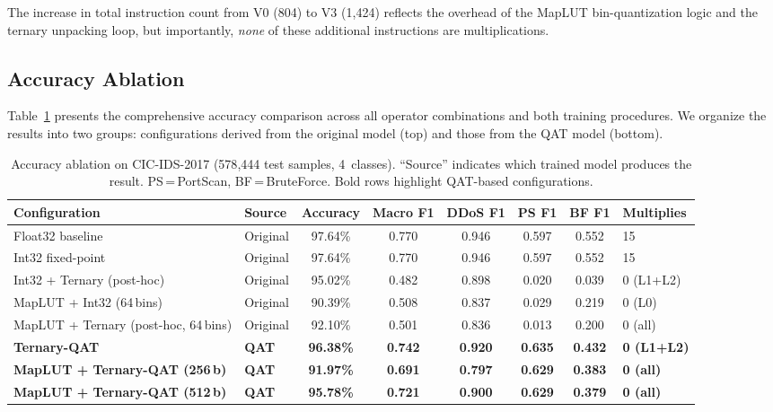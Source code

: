 \documentclass[sigconf,nonacm]{acmart}
\begin{document}
The increase in total instruction count from V0 (804) to V3 (1{,}424)
reflects the overhead of the MapLUT bin-quantization logic and the
ternary unpacking loop, but importantly, \emph{none} of these additional
instructions are multiplications.

\subsection{Accuracy Ablation}\label{sec:ablation}

Table~\ref{tab:ablation} presents the comprehensive accuracy comparison
across all operator combinations and both training procedures.
We organize the results into two groups: configurations derived from
the original model (top) and those from the QAT model (bottom).

\begin{table}[t]
\centering
\caption{Accuracy ablation on CIC-IDS-2017 (578{,}444 test samples,
4~classes).
``Source'' indicates which trained model produces the result.
PS\,=\,PortScan, BF\,=\,BruteForce. Bold rows highlight QAT-based
configurations.}
\label{tab:ablation}
\small
\begin{tabular}{@{}llcccccl@{}}
\toprule
Configuration & Source & Accuracy & Macro F1 & DDoS F1 & PS F1 & BF F1 & Multiplies \\
\midrule
Float32 baseline           & Original & 97.64\% & 0.770 & 0.946 & 0.597 & 0.552 & 15 \\
Int32 fixed-point          & Original & 97.64\% & 0.770 & 0.946 & 0.597 & 0.552 & 15 \\
Int32 + Ternary (post-hoc) & Original & 95.02\% & 0.482 & 0.898 & 0.020 & 0.039 & 0 (L1+L2) \\
MapLUT + Int32 (64\,bins)  & Original & 90.39\% & 0.508 & 0.837 & 0.029 & 0.219 & 0 (L0) \\
MapLUT + Ternary (post-hoc, 64\,bins) & Original & 92.10\% & 0.501 & 0.836 & 0.013 & 0.200 & 0 (all) \\
\midrule
\textbf{Ternary-QAT}                  & \textbf{QAT} & \textbf{96.38\%} & \textbf{0.742} & \textbf{0.920} & \textbf{0.635} & \textbf{0.432} & \textbf{0 (L1+L2)} \\
\textbf{MapLUT + Ternary-QAT (256\,b)} & \textbf{QAT} & \textbf{91.97\%} & \textbf{0.691} & \textbf{0.797} & \textbf{0.629} & \textbf{0.383} & \textbf{0 (all)} \\
\textbf{MapLUT + Ternary-QAT (512\,b)} & \textbf{QAT} & \textbf{95.78\%} & \textbf{0.721} & \textbf{0.900} & \textbf{0.629} & \textbf{0.379} & \textbf{0 (all)} \\
\bottomrule
\end{tabular}
\end{table}
\end{document}
